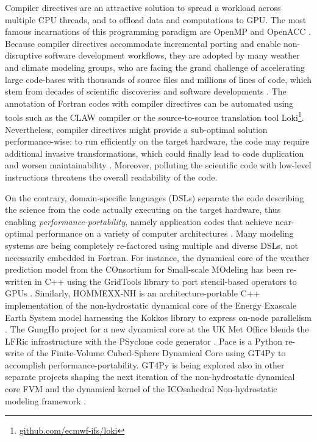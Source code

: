 \documentclass[../main.tex]{subfiles}
\begin{document}
    Compiler directives are an attractive solution to spread a workload across multiple CPU threads, and to offload data and computations to GPU. The most famous incarnations of this programming paradigm are OpenMP \citep{dagum98} and OpenACC \citep{chandrasekaran17}. Because compiler directives accommodate incremental porting and enable non-disruptive software development workflows, they are adopted by many weather and climate modeling groups, who are facing the grand challenge of accelerating large code-bases with thousands of source files and millions of lines of code, which stem from decades of scientific discoveries and software developments \citep{lapillonne17, lapillonne20, randall22}. The annotation of Fortran codes with compiler directives can be automated using tools such as the CLAW compiler \citep{clement19} or the source-to-source translation tool Loki\footnote{\url{github.com/ecmwf-ifs/loki}}. Nevertheless, compiler directives might provide a sub-optimal solution performance-wise: to run efficiently on the target hardware, the code may require additional invasive transformations, which could finally lead to code duplication and worsen maintainability \citep{dahm23}. Moreover, polluting the scientific code with low-level instructions threatens the overall readability of the code.

    On the contrary, domain-specific languages (DSLs) separate the code describing the science from the code actually executing on the target hardware, thus enabling \emph{performance-portability}, namely application codes that achieve near-optimal performance on a variety of computer architectures \citep{deakin19}. Many modeling systems are being completely re-factored using multiple and diverse DSLs, not necessarily embedded in Fortran. For instance, the dynamical core of the weather prediction model from the COnsortium for Small-scale MOdeling \citep[COSMO;][]{baldauf11} has been re-written in C++ using the GridTools library \citep{afanasyev21} to port stencil-based operators to GPUs \citep{fuhrer14, fuhrer18}. Similarly, HOMMEXX-NH \citep{bertagna20} is an architecture-portable C++ implementation of the non-hydrostatic dynamical core of the Energy Exascale Earth System model \citep[E3SM;][]{taylor20} harnessing the Kokkos library to express on-node parallelism \citep{edwards14}. The GungHo project for a new dynamical core at the UK Met Office blends the LFRic infrastructure with the PSyclone code generator \citep{adams19}. Pace \citep{ben-nun22, dahm23} is a Python re-write of the Finite-Volume Cubed-Sphere Dynamical Core \citep[FV3;][]{harris13} using GT4Py to accomplish performance-portability. GT4Py is being explored also in other separate projects shaping the next iteration of the non-hydrostatic dynamical core FVM \citep{kuhnlein23} and the dynamical kernel of the ICOsahedral Non-hydrostatic modeling framework \citep[ICON;][]{zangl15}.
\end{document}
